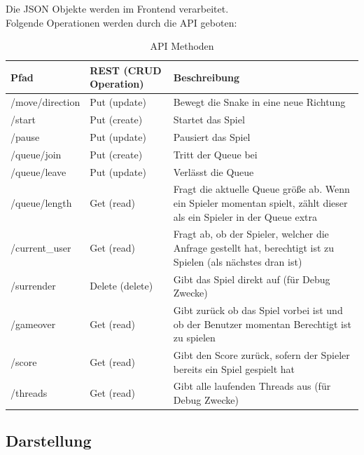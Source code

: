 \documentclass[a4paper,12pt]{scrartcl}
\begin{document}
Die JSON Objekte werden im Frontend verarbeitet.\\
Folgende Operationen werden durch die API geboten:


\newpage

\begin{table}
\centering
\begin{tabular}[!htb]{p{4cm}|p{4cm}|p{8cm}}
Pfad & REST (CRUD Operation) & Beschreibung \\
\hline
/move/{direction} & Put (update) & Bewegt die Snake in eine neue Richtung \\
/start & Put (create) & Startet das Spiel \\
/pause & Put (update) & Pausiert das Spiel \\
/queue/join & Put (create) & Tritt der Queue bei \\
/queue/leave & Put (update) & Verlässt die Queue \\
/queue/length & Get (read) & Fragt die aktuelle Queue größe ab. Wenn ein Spieler momentan spielt, zählt dieser als ein Spieler in der Queue extra \\
/current\_user & Get (read) & Fragt ab, ob der Spieler, welcher die Anfrage gestellt hat, berechtigt ist zu Spielen (als nächstes dran ist) \\
/surrender & Delete (delete) & Gibt das Spiel direkt auf (für Debug Zwecke) \\
/gameover & Get (read) & Gibt zurück ob das Spiel vorbei ist und ob der Benutzer momentan Berechtigt ist zu spielen \\
/score & Get (read) & Gibt den Score zurück, sofern der Spieler bereits ein Spiel gespielt hat \\
/threads & Get (read) & Gibt alle laufenden Threads aus (für Debug Zwecke)
\end{tabular}
\caption{API Methoden}
\end{table}


\subsection{Darstellung}
\end{document}
